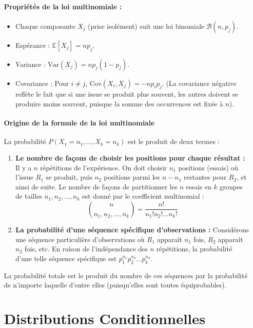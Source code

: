\paragraph{Propriétés de la loi multinomiale :}
\begin{itemize}
    \item Chaque composante $X_j$ (prise isolément) suit une loi binomiale $\mathcal{B}(n, p_j)$.
    \item Espérance : $\mathbb{E}[X_j] = np_j$.
    \item Variance : $\text{Var}(X_j) = np_j(1 - p_j)$.
    \item Covariance : Pour $i \neq j$, $\text{Cov}(X_i, X_j) = -np_i p_j$. (La covariance négative reflète le fait que si une issue se produit plus souvent, les autres doivent se produire moins souvent, puisque la somme des occurrences est fixée à $n$).
\end{itemize}

\paragraph{Origine de la formule de la loi multinomiale} La probabilité $P(X_1 = n_1, \dots, X_k = n_k)$ est le produit de deux termes :
\begin{enumerate}
    \item \textbf{Le nombre de façons de choisir les positions pour chaque résultat :} Il y a $n$ répétitions de l'expérience. On doit choisir $n_1$ positions (essais) où l'issue $R_1$ se produit, puis $n_2$ positions parmi les $n - n_1$ restantes pour $R_2$, et ainsi de suite. Le nombre de façons de partitionner les $n$ essais en $k$ groupes de tailles $n_1, n_2, \dots, n_k$ est donné par le coefficient multinomial :
    \[ \binom{n}{n_1, n_2, \dots, n_k} = \frac{n!}{n_1! n_2! \dots n_k!} \]
    \item \textbf{La probabilité d'une séquence spécifique d'observations :} Considérons une séquence particulière d'observations où $R_1$ apparaît $n_1$ fois, $R_2$ apparaît $n_2$ fois, etc. En raison de l'indépendance des $n$ répétitions, la probabilité d'une telle séquence spécifique est $p_1^{n_1} p_2^{n_2} \dots p_k^{n_k}$.
\end{enumerate}

\vspace{1em}
La probabilité totale est le produit du nombre de ces séquences par la probabilité de n'importe laquelle d'entre elles (puisqu'elles sont toutes équiprobables).

\section{ Distributions Conditionnelles}

